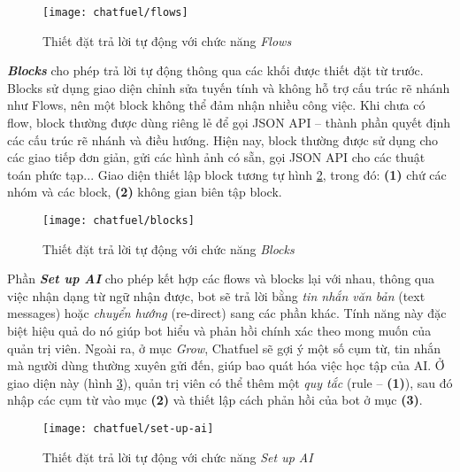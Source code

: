 \begin{figure}[htb!]\centering
	\texttt{[image: chatfuel/flows]}
	\caption{Thiết đặt trả lời tự động với chức năng \textit{Flows}}
	\label{fig:fig-c3-flows}
\end{figure}\par

\textbf{\textit{Blocks}} cho phép trả lời tự động thông qua các khối được thiết đặt từ trước. Blocks sử dụng giao diện chỉnh sửa tuyến tính và không hỗ trợ cấu trúc rẽ nhánh như Flows, nên một block không thể đảm nhận nhiều công việc. Khi chưa có flow, block thường được dùng riêng lẻ để gọi JSON API – thành phần quyết định các cấu trúc rẽ nhánh và điều hướng. Hiện nay, block thường được sử dụng cho các giao tiếp đơn giản, gửi các hình ảnh có sẵn, gọi JSON API cho các thuật toán phức tạp... Giao diện thiết lập block tương tự hình \ref{fig:fig-c3-blocks}, trong đó: \textbf{(1)} chứ các nhóm và các block, \textbf{(2)} không gian biên tập block.\par
\begin{figure}[htb!]\centering
	\texttt{[image: chatfuel/blocks]}
	\caption{Thiết đặt trả lời tự động với chức năng \textit{Blocks}}
	\label{fig:fig-c3-blocks}
\end{figure}\par

Phần \textbf{\textit{Set up AI}} cho phép kết hợp các flows và blocks lại với nhau, thông qua việc nhận dạng từ ngữ nhận được, bot sẽ trả lời bằng \textit{tin nhắn văn bản} (text messages) hoặc \textit{chuyển hướng} (re-direct) sang các phần khác. Tính năng này đặc biệt hiệu quả do nó giúp bot hiểu và phản hồi chính xác theo mong muốn của quản trị viên. Ngoài ra, ở mục \textit{Grow}, Chatfuel sẽ gợi ý một số cụm từ, tin nhắn mà người dùng thường xuyên gửi đến, giúp bao quát hóa việc học tập của AI. Ở giao diện này (hình \ref{fig:fig-c3-set-up-ai}), quản trị viên có thể thêm một \textit{quy tắc} (rule – \textbf{(1)}), sau đó nhập các cụm từ vào mục \textbf{(2)} và thiết lập cách phản hồi của bot ở mục \textbf{(3)}.\par
\begin{figure}[htb!]\centering
	\texttt{[image: chatfuel/set-up-ai]}
	\caption{Thiết đặt trả lời tự động với chức năng \textit{Set up AI}}
	\label{fig:fig-c3-set-up-ai}
\end{figure}\par

